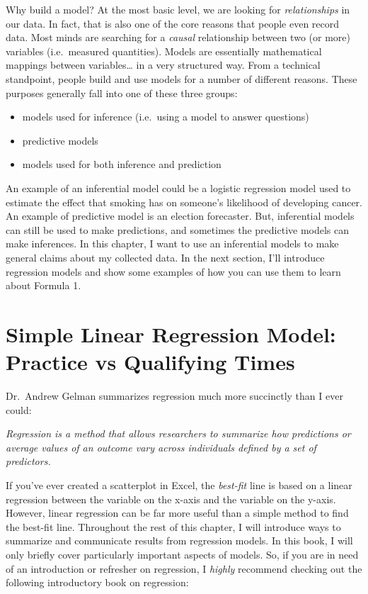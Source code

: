 \documentclass[
]{book}
\providecommand{\tightlist}{%
  \setlength{\itemsep}{0pt}\setlength{\parskip}{0pt}}
\begin{document}
Why build a model? At the most basic level, we are looking for \emph{relationships} in our data. In fact, that is also one of the core reasons that people even record data. Most minds are searching for a \emph{causal} relationship between two (or more) variables (i.e.~measured quantities). Models are essentially mathematical mappings between variables\ldots{} in a very structured way. From a technical standpoint, people build and use models for a number of different reasons. These purposes generally fall into one of these three groups:

\begin{itemize}
\tightlist
\item
  models used for inference (i.e.~using a model to answer questions)
\item
  predictive models
\item
  models used for both inference and prediction
\end{itemize}

An example of an inferential model could be a logistic regression model used to estimate the effect that smoking has on someone's likelihood of developing cancer. An example of predictive model is an election forecaster. But, inferential models can still be used to make predictions, and sometimes the predictive models can make inferences. In this chapter, I want to use an inferential models to make general claims about my collected data. In the next section, I'll introduce regression models and show some examples of how you can use them to learn about Formula 1.

\hypertarget{simple-linear-regression-model-practice-vs-qualifying-times}{%
\section{Simple Linear Regression Model: Practice vs Qualifying Times}\label{simple-linear-regression-model-practice-vs-qualifying-times}}

Dr.~Andrew Gelman summarizes regression much more succinctly than I ever could:

\emph{Regression is a method that allows researchers to summarize how predictions or average values of an outcome vary across individuals defined by a set of predictors.}

If you've ever created a scatterplot in Excel, the \emph{best-fit} line is based on a linear regression between the variable on the x-axis and the variable on the y-axis. However, linear regression can be far more useful than a simple method to find the best-fit line. Throughout the rest of this chapter, I will introduce ways to summarize and communicate results from regression models. In this book, I will only briefly cover particularly important aspects of models. So, if you are in need of an introduction or refresher on regression, I \emph{highly} recommend checking out the following introductory book on regression:
\end{document}
